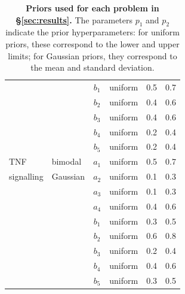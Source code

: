 \begin{table}[H]
\begin{adjustwidth}{0in}{0in}
\begin{tabularx}{1.0\textwidth}{llclcc}
&& $b_1$ & uniform & 0.5 & 0.7\\
&& $b_2$ & uniform & 0.4 & 0.6\\
&& $b_3$ & uniform & 0.4 & 0.6\\
&& $b_4$ & uniform & 0.2 & 0.4\\
&& $b_5$ & uniform & 0.2 & 0.4\\
\toprule
TNF  & bimodal  & $a_1$ & uniform & 0.5 & 0.7\\
signalling& Gaussian & $a_2$ & uniform & 0.1 & 0.3\\
&& $a_3$ & uniform & 0.1 & 0.3\\
&& $a_4$ & uniform & 0.4 & 0.6\\
&& $b_1$ & uniform & 0.3 & 0.5\\
&& $b_2$ & uniform & 0.6 & 0.8\\
&& $b_3$ & uniform & 0.2 & 0.4\\
&& $b_4$ & uniform & 0.4 & 0.6\\
&& $b_5$ & uniform & 0.3 & 0.5\\
\end{tabularx}
\caption{\textbf{Priors used for each problem in \S\ref{sec:results}.} The parameters $p_1$ and $p_2$ indicate the prior hyperparameters: for uniform priors, these correspond to the lower and upper limits; for Gaussian priors, they correspond to the mean and standard deviation.}
\label{tab:priors}
\end{adjustwidth}
\end{table}
